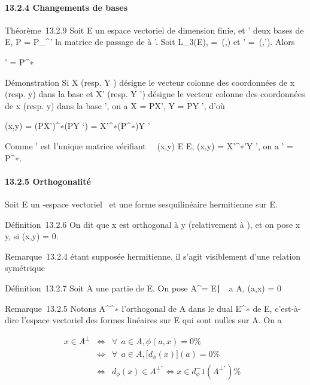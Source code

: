 \documentclass[]{article}
\begin{document}
\paragraph{13.2.4 Changements de bases}

Théorème~13.2.9 Soit E un espace vectoriel de dimension finie,  et '
deux bases de E, P = P_^' la matrice de passage de  à
'. Soit \phi \in L_3(E), \Omega =\
\mathrmMat (\phi,) et \Omega' =\
\mathrmMat (\phi,'). Alors

\Omega' = P^∗\OmegaP

Démonstration Si X (resp. Y ) désigne le vecteur colonne des coordonnées
de x (resp. y) dans la base  et X' (resp. Y ') désigne le vecteur
colonne des coordonnées de x (resp. y) dans la base \mathcal{E}', on a X = PX', Y
= PY ', d'où

\phi(x,y) = (PX')^∗\Omega(PY `) = X'^∗(P^∗\OmegaP)Y
'

Comme \Omega' est l'unique matrice vérifiant \forall~~(x,y)
\in E \times E, \phi(x,y) = X'^∗\Omega'Y ', on a \Omega' = P^∗\OmegaP.

\paragraph{13.2.5 Orthogonalité}

Soit E un -espace vectoriel ~et \phi une forme sesquilinéaire hermitienne
sur E.

Définition~13.2.6 On dit que x est orthogonal à y (relativement à \phi), et
on pose x \bot y, si \phi(x,y) = 0.

Remarque~13.2.4 \phi étant supposée hermitienne, il s'agit visiblement
d'une relation symétrique

Définition~13.2.7 Soit A une partie de E. On pose A^\bot =
\x \in
E∣\forall~~a \in A, \phi(a,x) =
0\

Remarque~13.2.5 Notons A^\bot^∗  l'orthogonal de A
dans le dual E^∗ de E, c'est-à-dire l'espace vectoriel des
formes linéaires sur E qui sont nulles sur A. On a

\begin{align*} x \in A^\bot&
\Leftrightarrow & \forall~~a \in A, \phi(a,x)
= 0 \%& \\ &
\Leftrightarrow & \forall~~a \in A,
\big [d_\phi(x)\big ](a) = 0
\%& \\ & \Leftrightarrow &
d_\phi(x) \in A^\bot^∗ 
\Leftrightarrow x \in
d_\phi^-1(A^\bot^∗ )\%&
\\ \end{align*}
\end{document}

